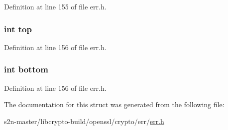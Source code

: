Definition at line 155 of file err.\+h.

\subsubsection[{\texorpdfstring{top}{top}}]{\setlength{\rightskip}{0pt plus 5cm}int top}\hypertarget{structerr__state__st_af93f4f37fc2ad9c37af4a715423b110c}{}\label{structerr__state__st_af93f4f37fc2ad9c37af4a715423b110c}


Definition at line 156 of file err.\+h.

\subsubsection[{\texorpdfstring{bottom}{bottom}}]{\setlength{\rightskip}{0pt plus 5cm}int bottom}\hypertarget{structerr__state__st_a323a7064fba6e15e3e542e34fb19764e}{}\label{structerr__state__st_a323a7064fba6e15e3e542e34fb19764e}


Definition at line 156 of file err.\+h.



The documentation for this struct was generated from the following file\+:\begin{DoxyCompactItemize}
\item 
s2n-\/master/libcrypto-\/build/openssl/crypto/err/\hyperlink{crypto_2err_2err_8h}{err.\+h}\end{DoxyCompactItemize}

